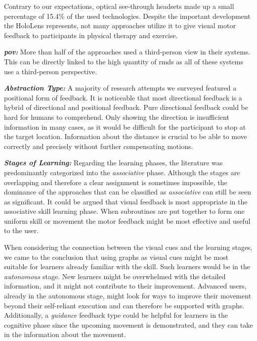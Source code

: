 Contrary to our expectations, optical see-through headsets made up a small percentage of 15.4\% of the used technologies. Despite the important development the HoloLens represents, not many approaches utilize it to give visual motor feedback to participants in physical therapy and exercise.

\textbf{\emph{\Acrshort{pov}:}} More than half of the approaches used a third-person view in their systems. This can be directly linked to the high quantity of \acrshort{rmd}s as all of these systems use a third-person perspective.

\textbf{\emph{Abstraction Type:}} A majority of research attempts we surveyed featured a positional form of feedback. It is noticeable that most directional feedback is a hybrid of directional and positional feedback. Pure directional feedback could be hard for humans to comprehend. Only showing the direction is insufficient information in many cases, as it would be difficult for the participant to stop at the target location. Information about the distance is crucial to be able to move correctly and precisely without further compensating motions.

\textbf{\emph{Stages of Learning:}} Regarding the learning phases, the literature was predominantly categorized into the \emph{associative} phase. Although the stages are overlapping and therefore a clear assignment is sometimes impossible, the dominance of the approaches that can be classified as \emph{associative} can still be seen as significant. It could be argued that visual feedback is most appropriate in the associative skill learning phase. When subroutines are put together to form one uniform skill or movement the motor feedback might be most effective and useful to the user.

When considering the connection between the visual cues and the learning stages, we came to the conclusion that using graphs as visual cues might be most suitable for learners already familiar with the skill. Such learners would be in the \emph{autonomous} stage. New learners might be overwhelmed with the detailed information, and it might not contribute to their improvement. Advanced users, already in the autonomous stage, might look for ways to improve their movement beyond their self-reliant execution and can therefore be supported with graphs. Additionally, a \emph{guidance} feedback type could be helpful for learners in the cognitive phase since the upcoming movement is demonstrated, and they can take in the information about the movement.

